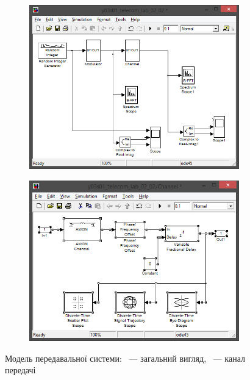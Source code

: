 \documentclass[
	a4paper,
	oneside,
	BCOR = 10mm,
	DIV = 12,
	12pt,
	headings = normal,
]{scrartcl}
\begin{document}
			\begin{figure}[!htbp]
				\begin{subfigure}[t]{\textwidth / 2}
					\centering
					\includegraphics[height = 9\baselineskip]{./assets/y03s01-telecom-lab-02-02-p01-model-general.png}
					\caption{}
					\label{subfig:01-simulink-tx-model-full}
				\end{subfigure}%
				\begin{subfigure}[t]{\textwidth / 2}
					\centering
					\includegraphics[height = 9\baselineskip]{./assets/y03s01-telecom-lab-02-02-p02-model-channel.png}
					\caption{}
					\label{subfig:01-simulink-tx-model-transmitter}
				\end{subfigure}
				\caption{Модель передавальної системи: ~— загальний вигляд, ~— канал передачі}
				\label{fig:01-simulink-tx-model}
			\end{figure}
\end{document}
